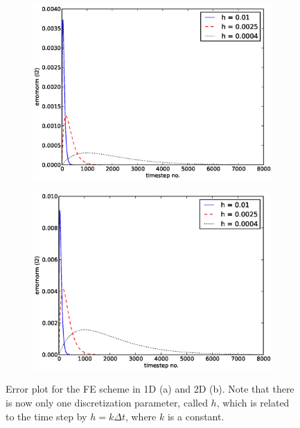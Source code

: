 \begin{figure}[H]
 \centering
 \begin{subfigure}{0.49\textwidth}
  \includegraphics[width=\textwidth]{../results/experiment_22052014_1327_FE1D_new_plots/results/errorplot.eps}
  \caption{}
 \end{subfigure}
 \begin{subfigure}{0.49\textwidth}
  \includegraphics[width=\textwidth]{../results/experiment_22052014_1323_FE2D_new_plots/results/errorplot.eps}
  \caption{}
 \end{subfigure}
 \caption[Error plots FE]{Error plot for the FE scheme in 1D (a) and 2D (b). Note that there is now only one discretization parameter, called $h$, which is related to the time step by $h = k\Delta t$, where $k$ is a constant.}
 \label{analysis:errorplots:FE}
\end{figure}


